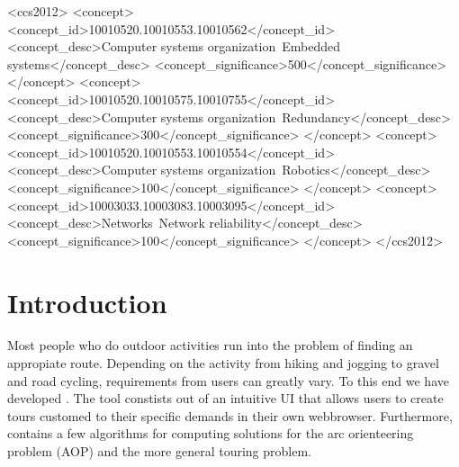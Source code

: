 \documentclass[sigconf,natbib=false]{acmart}
\begin{document}
\begin{CCSXML}
<ccs2012>
 <concept>
  <concept_id>10010520.10010553.10010562</concept_id>
  <concept_desc>Computer systems organization~Embedded systems</concept_desc>
  <concept_significance>500</concept_significance>
 </concept>
 <concept>
  <concept_id>10010520.10010575.10010755</concept_id>
  <concept_desc>Computer systems organization~Redundancy</concept_desc>
  <concept_significance>300</concept_significance>
 </concept>
 <concept>
  <concept_id>10010520.10010553.10010554</concept_id>
  <concept_desc>Computer systems organization~Robotics</concept_desc>
  <concept_significance>100</concept_significance>
 </concept>
 <concept>
  <concept_id>10003033.10003083.10003095</concept_id>
  <concept_desc>Networks~Network reliability</concept_desc>
  <concept_significance>100</concept_significance>
 </concept>
</ccs2012>
\end{CCSXML}



\maketitle

\section{Introduction}

Most people who do outdoor activities run into the problem of finding an appropiate route. 
Depending on the activity from hiking and jogging to gravel and road cycling, requirements from users can greatly vary.
To this end we have developed \tG. 
The tool \tG constists out of an intuitive UI that allows users to create tours customed to their specific demands in their own webbrowser. Furthermore, \tG contains a few algorithms for computing solutions for the arc orienteering problem (AOP) and the more general touring problem.
\end{document}
